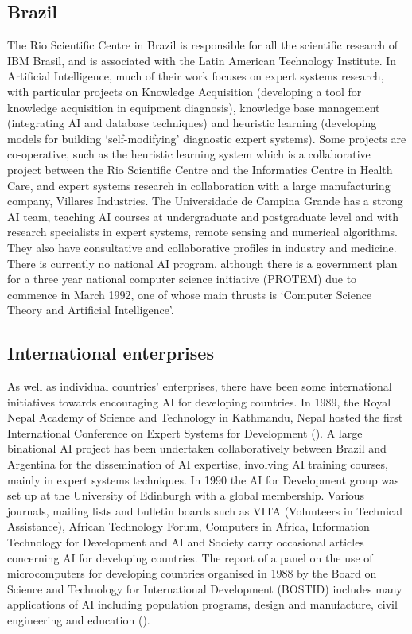 \subsection{Brazil}
The Rio Scientific Centre in Brazil is responsible for all the
scientific research of IBM Brasil, and is associated with the Latin
American Technology Institute. In Artificial Intelligence, much of
their work focuses on expert systems research, with particular
projects on Knowledge Acquisition (developing a tool for knowledge
acquisition in equipment diagnosis), knowledge base management
(integrating AI and database techniques) and heuristic learning
(developing models for building `self-modifying' diagnostic expert
systems). Some projects are co-operative, such as the heuristic
learning system which is a collaborative project between the Rio
Scientific Centre and the Informatics Centre in Health Care, and
expert systems research in collaboration with a large manufacturing
company, Villares Industries. The Universidade de Campina Grande has a
strong AI team, teaching AI courses at undergraduate and postgraduate
level and with research specialists in expert systems, remote sensing
and numerical algorithms. They also have consultative and
collaborative profiles in industry and medicine. There is currently no
national AI program, although there is a government plan for a three
year national computer science initiative (PROTEM) due to commence in
March 1992, one of whose main thrusts is `Computer Science Theory and
Artificial Intelligence'. 

\subsection{International enterprises}
As well as individual countries' enterprises, there have been some
international initiatives towards encouraging AI for developing
countries. In 1989, the Royal Nepal Academy of Science and Technology
in Kathmandu, Nepal hosted the first International Conference on
Expert Systems for Development (\cite{sadananda89}). A large
binational AI project has been undertaken collaboratively between
Brazil and Argentina for the dissemination of AI expertise, involving
AI training courses, mainly in expert systems techniques. In 1990 the
AI for Development group was set up at the University of Edinburgh
with a global membership. Various
journals, mailing lists and bulletin boards such as VITA (Volunteers
in Technical Assistance), African Technology Forum, Computers in
Africa, Information Technology for Development and AI and Society
carry occasional articles concerning AI for developing countries. The
report of a panel on the use of microcomputers for developing
countries organised in 1988 by the Board on Science and Technology for
International Development (BOSTID) includes many applications of AI
including population programs, design and manufacture, civil
engineering and education (\cite{bostid88}).

